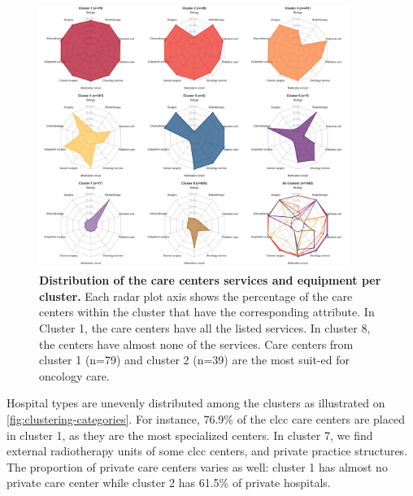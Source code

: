\begin{figure}[H]
    \includegraphics[width=0.9\textwidth]{images/camion/fig1_clusters_services.png}
    \centering
    \caption{ \textbf{Distribution of the care centers services and equipment
            per cluster.} Each radar plot axis shows the percentage of the care
        centers within the cluster that have the corresponding attribute. In
        Cluster 1, the care centers have all the listed services. In cluster 8,
        the centers have almost none of the services. Care centers from cluster
        1 (n=79) and cluster 2 (n=39) are the most suit-ed for oncology care. }
    \label{fig:clustering-spider}
\end{figure}

Hospital types are unevenly distributed among the clusters as illustrated on
\cref{fig:clustering-categories}. For instance, 76.9\% of the \ac{clcc} care
centers are placed in cluster 1, as they are the most specialized centers. In
cluster 7, we find external radiotherapy units of some \ac{clcc} centers, and
private practice structures. The proportion of private care centers varies as
well: cluster 1 has almost no private care center while cluster 2 has 61.5\% of
private hospitals.

